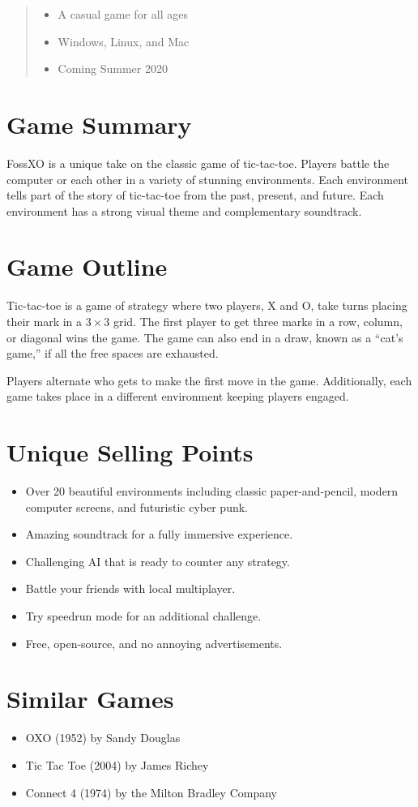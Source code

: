 \documentclass{tufte-handout}
\begin{document}
\begin{abstract}
  \begin{itemize}[noitemsep,label=]
    \item A casual game for all ages
    \item Windows, Linux, and Mac
    \item Coming Summer 2020
  \end{itemize}
\end{abstract}


\section{Game Summary}
FossXO is a unique take on the classic game of tic-tac-toe. Players battle the
computer or each other in a variety of stunning environments. Each environment
tells part of the story of tic-tac-toe from the past, present, and future. Each
environment has a strong visual theme and complementary soundtrack.


\section{Game Outline}
Tic-tac-toe is a game of strategy where two players, X and O, take turns placing
their mark in a $3\times3$ grid. The first player to get three marks in a row,
column, or diagonal wins the game. The game can also end in a draw, known as a
``cat's game,'' if all the free spaces are exhausted.

Players alternate who gets to make the first move in the game. Additionally,
each game takes place in a different environment keeping players engaged.


\section{Unique Selling Points}
\begin{itemize}[noitemsep]
  \item {
    Over 20 beautiful environments including classic paper-and-pencil, modern
    computer screens, and futuristic cyber punk.
  }
  \item Amazing soundtrack for a fully immersive experience.
  \item Challenging AI that is ready to counter any strategy.
  \item Battle your friends with local multiplayer.
  \item Try speedrun mode for an additional challenge.
  \item Free, open-source, and no annoying advertisements.
\end{itemize}


\section{Similar Games}
\begin{itemize}[noitemsep]
  \item OXO (1952) by Sandy Douglas
  \item Tic Tac Toe (2004) by James Richey
  \item Connect 4 (1974) by the Milton Bradley Company
\end{itemize}
\end{document}
